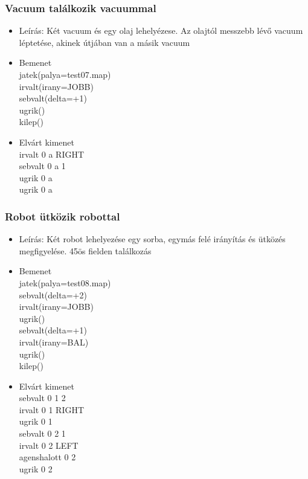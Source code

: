\subsubsection{Vacuum találkozik vacuummal}
\begin{itemize}
  \item Leírás: Két vacuum és egy olaj lehelyézese. Az olajtól messzebb lévő vacuum léptetése, akinek útjában van a másik vacuum
  \item Bemenet\\
    jatek(palya=test07.map)\\
    irvalt(irany=JOBB)\\
    sebvalt(delta=+1)\\
    ugrik()\\
    kilep()\\
  \item Elvárt kimenet\\
    irvalt 0 a RIGHT \\
    sebvalt 0 a 1 \\ 
    ugrik 0 a \\
    ugrik 0 a \\
    

\end{itemize}

\subsubsection{Robot ütközik robottal}
\begin{itemize}
  \item Leírás: Két robot lehelyezése egy sorba, egymás felé irányítás és ütközés megfigyelése. 45ös fielden találkozás
  \item Bemenet\\
    jatek(palya=test08.map)\\
    sebvalt(delta=+2)\\
    irvalt(irany=JOBB)\\
    ugrik()\\
    sebvalt(delta=+1)\\
    irvalt(irany=BAL)\\
    ugrik()\\
    kilep()\\
  \item Elvárt kimenet\\
    sebvalt 0 1 2 \\
    irvalt 0 1 RIGHT \\
    ugrik 0 1 \\
    sebvalt 0 2 1 \\
    irvalt 0 2 LEFT \\
    agenshalott 0 2 \\
    ugrik 0 2 \\

\end{itemize}


